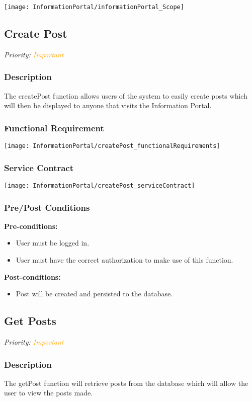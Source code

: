 
\texttt{[image: InformationPortal/informationPortal\_Scope]}

\subsection{Create Post}
\textit{Priority: \textcolor{orange}{Important}}

\subsubsection{Description}
The createPost function allows users of the system to easily create posts which will then be displayed to anyone that visits the Information Portal.
	
\subsubsection{Functional Requirement}
\texttt{[image: InformationPortal/createPost\_functionalRequirements]}

\subsubsection{Service Contract}
\texttt{[image: InformationPortal/createPost\_serviceContract]}

\subsubsection{Pre/Post Conditions}
	\textbf{Pre-conditions:}
	\begin{itemize}
		\item User must be logged in.
		\item User must have the correct authorization to make use of this function.
	\end{itemize}
	\textbf{Post-conditions:}
	\begin{itemize}
		\item Post will be created and persisted to the database.
	\end{itemize}

\subsection{Get Posts}
\textit{Priority: \textcolor{orange}{Important}}

\subsubsection{Description}
The getPost function will retrieve posts from the database which will allow the user to view the posts made.

